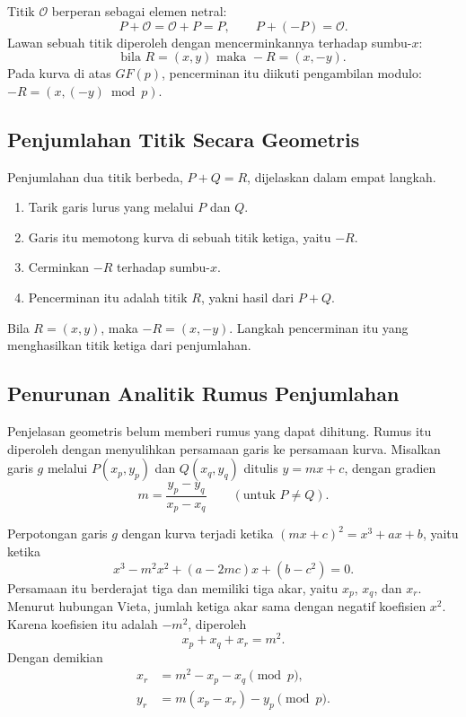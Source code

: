 Titik $\mathcal{O}$ berperan sebagai elemen netral:
\begin{equation}
P + \mathcal{O} = \mathcal{O} + P = P ,
\qquad
P + (-P) = \mathcal{O} .
\label{eq:titik-o}
\end{equation}
Lawan sebuah titik diperoleh dengan mencerminkannya terhadap sumbu-$x$:
\[
\text{bila } R = (x, y) \text{ maka } -R = (x, -y) .
\]
Pada kurva di atas $GF(p)$, pencerminan itu diikuti pengambilan modulo:
$-R = (x, (-y) \bmod p)$.

\subsection{Penjumlahan Titik Secara Geometris}
\label{subsec:penjumlahan-geometri}

Penjumlahan dua titik berbeda, $P + Q = R$, dijelaskan dalam empat langkah.

\begin{enumerate}
    \item Tarik garis lurus yang melalui $P$ dan $Q$.
    \item Garis itu memotong kurva di sebuah titik ketiga, yaitu $-R$.
    \item Cerminkan $-R$ terhadap sumbu-$x$.
    \item Pencerminan itu adalah titik $R$, yakni hasil dari $P + Q$.
\end{enumerate}

Bila $R = (x, y)$, maka $-R = (x, -y)$. Langkah pencerminan itu yang
menghasilkan titik ketiga dari penjumlahan.

\subsection{Penurunan Analitik Rumus Penjumlahan}
\label{subsec:analitik-penjumlahan}

Penjelasan geometris belum memberi rumus yang dapat dihitung. Rumus itu
diperoleh dengan menyulihkan persamaan garis ke persamaan kurva. Misalkan garis
$g$ melalui $P(x_p, y_p)$ dan $Q(x_q, y_q)$ ditulis $y = mx + c$, dengan
gradien
\begin{equation}
m = \frac{y_p - y_q}{x_p - x_q} \qquad (\text{untuk } P \neq Q).
\label{eq:gradien-pq}
\end{equation}

Perpotongan garis $g$ dengan kurva terjadi ketika
$(mx + c)^2 = x^3 + ax + b$, yaitu ketika
\[
x^3 - m^2x^2 + (a - 2mc)x + (b - c^2) = 0 .
\]
Persamaan itu berderajat tiga dan memiliki tiga akar, yaitu $x_p$, $x_q$, dan
$x_r$. Menurut hubungan Vieta, jumlah ketiga akar sama dengan negatif
koefisien $x^2$. Karena koefisien itu adalah $-m^2$, diperoleh
\[
x_p + x_q + x_r = m^2 .
\]
Dengan demikian
\begin{equation}
\begin{aligned}
x_r &= m^2 - x_p - x_q \pmod{p}, \\
y_r &= m(x_p - x_r) - y_p \pmod{p} .
\end{aligned}
\label{eq:koordinat-pq}
\end{equation}

